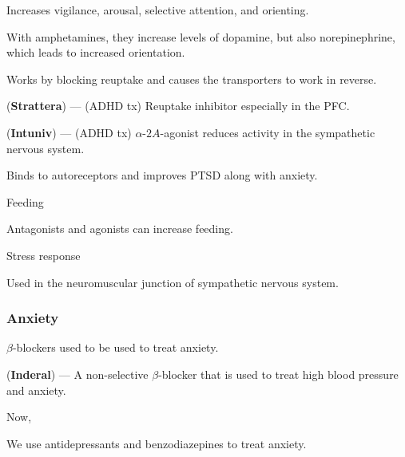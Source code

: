 \begin{coloredlist}
    \item Increases vigilance, arousal, selective attention, and orienting.
    \begin{coloredlist}
        \item With amphetamines, they increase levels of dopamine, but also norepinephrine, which leads to increased orientation.
        \begin{coloredlist}
            \item Works by blocking reuptake and causes the transporters to work in reverse.
        \end{coloredlist}
        \item {} (\textbf{Strattera}) — (ADHD tx) Reuptake inhibitor especially in the PFC.
        \item {} (\textbf{Intuniv}) — (ADHD tx) \(\alpha\text{-}2A\)-agonist reduces activity in the sympathetic nervous system.
        \begin{coloredlist}
            \item Binds to autoreceptors and improves PTSD along with anxiety.
        \end{coloredlist}
    \end{coloredlist}
    \item Feeding
    \begin{coloredlist}
        \item Antagonists and agonists can increase feeding.
    \end{coloredlist}
    \item Stress response
    \begin{coloredlist}
        \item Used in the neuromuscular junction of sympathetic nervous system.
    \end{coloredlist}
\end{coloredlist}

\subsubsection{Anxiety}

\begin{coloredlist}
    \item \(\beta\)-blockers used to be used to treat anxiety.
    \begin{coloredlist}
        \item {} (\textbf{Inderal}) — A non-selective \(\beta\)-blocker that is used to treat high blood pressure and anxiety.
    \end{coloredlist}
    \item Now, 
    \begin{coloredlist}
        \item We use antidepressants and benzodiazepines to treat anxiety.
    \end{coloredlist}
\end{coloredlist}

